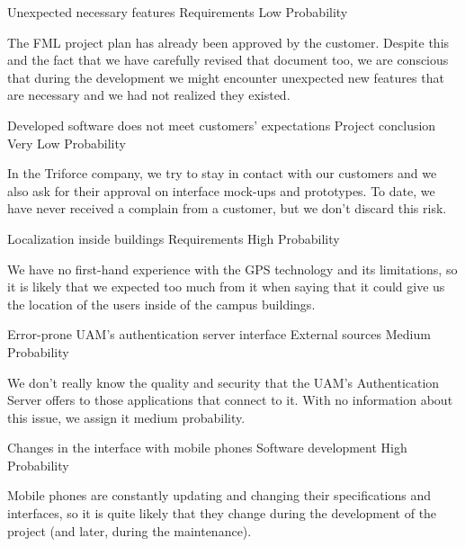 \begin{risk}[riskFeaturesUnexpected]{Unexpected necessary features}
\riskcat Requirements
 Low Probability

The FML project plan has already been approved by the customer. Despite this and the fact that we have carefully revised that document too, we are conscious that during the development we might encounter unexpected new features that are necessary and we had not realized they existed.
\end{risk}

\begin{risk}[riskExpectations]{Developed software does not meet customers' expectations}
\riskcat Project conclusion
 Very Low Probability

In the Triforce company, we try to stay in contact with our customers and we also ask for their approval on interface mock-ups and prototypes. To date, we have never received a complain from a customer, but we don't discard this risk.
\end{risk}

\begin{risk}[riskLocalization]{Localization inside buildings}
\riskcat Requirements
 High Probability

We have no first-hand experience with the GPS technology and its limitations, so it is likely that we expected too much from it when saying that it could give us the location of the users inside of the campus buildings.
\end{risk}

\begin{risk}[riskAuthServer]{Error-prone UAM's authentication server interface}
\riskcat External sources
 Medium Probability

We don't really know the quality and security that the UAM's Authentication Server offers to those applications that connect to it. With no information about this issue, we assign it medium probability.
\end{risk}

\begin{risk}[riskPhone]{Changes in the interface with mobile phones}
\riskcat Software development
 High Probability

Mobile phones are constantly updating and changing their specifications and interfaces, so it is quite likely that they change during the development of the project (and later, during the maintenance).
\end{risk}

